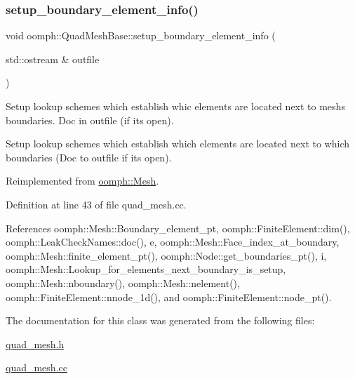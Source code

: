 \mbox{\label{classoomph_1_1QuadMeshBase_ac61bda5612c87848bb640c8e24371a54}} 
\subsubsection{\texorpdfstring{setup\+\_\+boundary\+\_\+element\+\_\+info()}{setup\_boundary\_element\_info()}\hspace{0.1cm}{\footnotesize\ttfamily [2/2]}}
{\footnotesize\ttfamily void oomph\+::\+Quad\+Mesh\+Base\+::setup\+\_\+boundary\+\_\+element\+\_\+info (\begin{DoxyParamCaption}\item[{std\+::ostream \&}]{outfile }\end{DoxyParamCaption})\hspace{0.3cm}{\ttfamily [virtual]}}



Setup lookup schemes which establish whic elements are located next to mesh\textquotesingle{}s boundaries. Doc in outfile (if it\textquotesingle{}s open). 

Setup lookup schemes which establish which elements are located next to which boundaries (Doc to outfile if it\textquotesingle{}s open). 

Reimplemented from \hyperlink{classoomph_1_1Mesh_a413cbcbea4fb1111703da9ee97429640}{oomph\+::\+Mesh}.



Definition at line 43 of file quad\+\_\+mesh.\+cc.



References oomph\+::\+Mesh\+::\+Boundary\+\_\+element\+\_\+pt, oomph\+::\+Finite\+Element\+::dim(), oomph\+::\+Leak\+Check\+Names\+::doc(), e, oomph\+::\+Mesh\+::\+Face\+\_\+index\+\_\+at\+\_\+boundary, oomph\+::\+Mesh\+::finite\+\_\+element\+\_\+pt(), oomph\+::\+Node\+::get\+\_\+boundaries\+\_\+pt(), i, oomph\+::\+Mesh\+::\+Lookup\+\_\+for\+\_\+elements\+\_\+next\+\_\+boundary\+\_\+is\+\_\+setup, oomph\+::\+Mesh\+::nboundary(), oomph\+::\+Mesh\+::nelement(), oomph\+::\+Finite\+Element\+::nnode\+\_\+1d(), and oomph\+::\+Finite\+Element\+::node\+\_\+pt().



The documentation for this class was generated from the following files\+:\begin{DoxyCompactItemize}
\item 
\hyperlink{quad__mesh_8h}{quad\+\_\+mesh.\+h}\item 
\hyperlink{quad__mesh_8cc}{quad\+\_\+mesh.\+cc}\end{DoxyCompactItemize}
